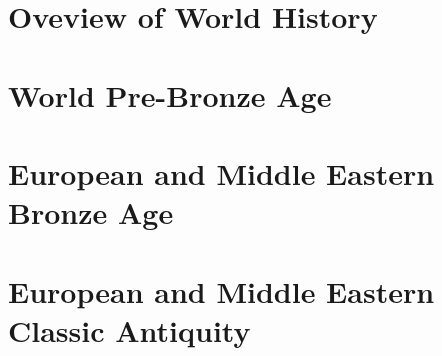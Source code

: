 \documentclass{article}
\begin{document}
\iffalse

Time line and chapter for:
Europe and Middle East;
Asia excluding Middle East;
Oceania;
Sub-Saharan Africa;
Americas;


I also want to include:
major bettles and events;
wide adoption of technology, like paper, printing press, computer...;


There should a environmets or command that simplifies creating the time lines.
The user should be able to define a time line where the user can start, stop, increase 
or decrease the time line or split it.
The user can speciy the coller and the text it should display.

Environment:
- fixed 15 column/timelines.
- The width of a timeline is given in mm
- The location/which column and start end is given in the timeline.
- If the time line need to change the column then a new time line needs to defined.
- To connect time lines you have "connect" or "transition" which is a dashed line.
- You can define a split given the start and finish.


\fi

\section{Oveview of World History}

\begin{timeline}[14][24][250][-3300][2025]
\end{timeline}


\section{World Pre-Bronze Age}

\section{European and Middle Eastern Bronze Age}

\section{European and Middle Eastern Classic Antiquity}
\begin{timeline}[13][20][50][-600][500]


\end{timeline}
\end{document}
